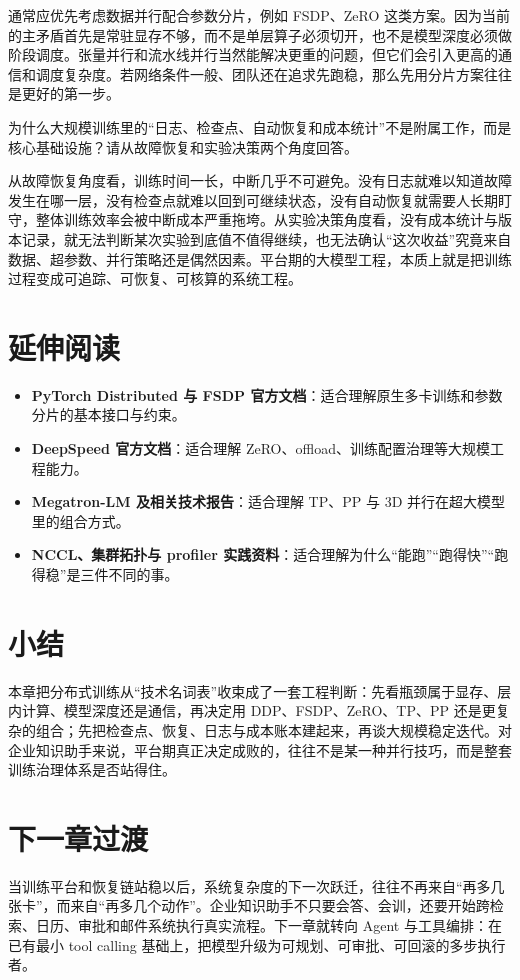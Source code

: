 \begin{solution}
通常应优先考虑{\heiti 数据并行配合参数分片}，例如 FSDP、ZeRO 这类方案。因为当前的主矛盾首先是{\heiti 常驻显存不够}，而不是单层算子必须切开，也不是模型深度必须做阶段调度。张量并行和流水线并行当然能解决更重的问题，但它们会引入更高的通信和调度复杂度。若网络条件一般、团队还在追求先跑稳，那么先用分片方案往往是更好的第一步。
\end{solution}

\begin{exercise}[训练故障归因]
为什么大规模训练里的“日志、检查点、自动恢复和成本统计”不是附属工作，而是核心基础设施？请从故障恢复和实验决策两个角度回答。
\end{exercise}

\begin{solution}
从{\heiti 故障恢复}角度看，训练时间一长，中断几乎不可避免。没有日志就难以知道故障发生在哪一层，没有检查点就难以回到可继续状态，没有自动恢复就需要人长期盯守，整体训练效率会被中断成本严重拖垮。从{\heiti 实验决策}角度看，没有成本统计与版本记录，就无法判断某次实验到底值不值得继续，也无法确认“这次收益”究竟来自数据、超参数、并行策略还是偶然因素。平台期的大模型工程，本质上就是把训练过程变成{\heiti 可追踪、可恢复、可核算}的系统工程。
\end{solution}

\section{延伸阅读}
\begin{itemize}
  \item \textbf{PyTorch Distributed 与 FSDP 官方文档}：适合理解原生多卡训练和参数分片的基本接口与约束。
  \item \textbf{DeepSpeed 官方文档}：适合理解 ZeRO、offload、训练配置治理等大规模工程能力。
  \item \textbf{Megatron-LM 及相关技术报告}：适合理解 TP、PP 与 3D 并行在超大模型里的组合方式。
  \item \textbf{NCCL、集群拓扑与 profiler 实践资料}：适合理解为什么“能跑”“跑得快”“跑得稳”是三件不同的事。
\end{itemize}

\section{小结}
本章把分布式训练从“技术名词表”收束成了一套工程判断：先看瓶颈属于显存、层内计算、模型深度还是通信，再决定用 DDP、FSDP、ZeRO、TP、PP 还是更复杂的组合；先把检查点、恢复、日志与成本账本建起来，再谈大规模稳定迭代。对企业知识助手来说，平台期真正决定成败的，往往不是某一种并行技巧，而是整套训练治理体系是否站得住。

\section{下一章过渡}
当训练平台和恢复链站稳以后，系统复杂度的下一次跃迁，往往不再来自“再多几张卡”，而来自“再多几个动作”。企业知识助手不只要会答、会训，还要开始跨检索、日历、审批和邮件系统执行真实流程。下一章就转向 Agent 与工具编排：在已有最小 tool calling 基础上，把模型升级为可规划、可审批、可回滚的多步执行者。

